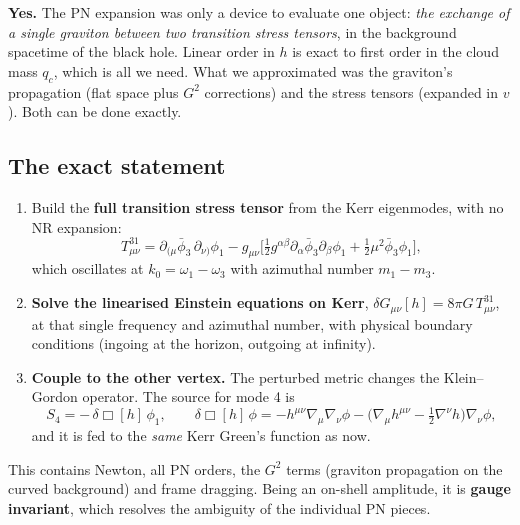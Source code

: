 \documentclass[11pt]{article}
\begin{document}
\textbf{Yes.} The PN expansion was only a device to evaluate one object: \emph{the exchange of a single graviton between two transition stress tensors}, in the background spacetime of the black hole. Linear order in $h$ is exact to first order in the cloud mass $q_c$, which is all we need. What we approximated was the graviton's propagation (flat space plus $G^2$ corrections) and the stress tensors (expanded in $v$). Both can be done exactly.

\subsection{The exact statement}
\begin{enumerate}[leftmargin=1.4em]
\item Build the \textbf{full transition stress tensor} from the Kerr eigenmodes, with no NR expansion:
\[
T^{31}_{\mu\nu}=\partial_{(\mu}\bar\phi_3\,\partial_{\nu)}\phi_1-g_{\mu\nu}\big[\tfrac12g^{\alpha\beta}\partial_\alpha\bar\phi_3\partial_\beta\phi_1+\tfrac12\mu^2\bar\phi_3\phi_1\big],
\]
which oscillates at $k_0=\omega_1-\omega_3$ with azimuthal number $m_1-m_3$.
\item \textbf{Solve the linearised Einstein equations on Kerr}, $\delta G_{\mu\nu}[h]=8\pi G\,T^{31}_{\mu\nu}$, at that single frequency and azimuthal number, with physical boundary conditions (ingoing at the horizon, outgoing at infinity).
\item \textbf{Couple to the other vertex.} The perturbed metric changes the Klein--Gordon operator. The source for mode 4 is
\[
S_4=-\,\delta\Box[h]\,\phi_1,\qquad\delta\Box[h]\,\phi=-h^{\mu\nu}\nabla_\mu\nabla_\nu\phi-\big(\nabla_\mu h^{\mu\nu}-\tfrac12\nabla^\nu h\big)\nabla_\nu\phi,
\]
and it is fed to the \emph{same} Kerr Green's function as now.
\end{enumerate}
This contains Newton, all PN orders, the $G^2$ terms (graviton propagation on the curved background) and frame dragging. Being an on-shell amplitude, it is \textbf{gauge invariant}, which resolves the ambiguity of the individual PN pieces.
\end{document}
